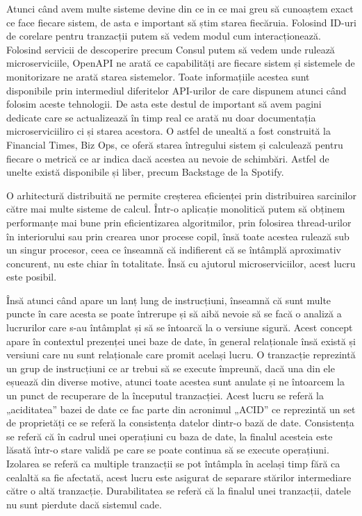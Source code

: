 Atunci când avem multe sisteme devine din ce in ce mai greu să cunoaștem exact ce face fiecare sistem,
de asta e important să știm starea fiecăruia. Folosind ID-uri de corelare pentru tranzacții
putem să vedem modul cum interacționează. Folosind servicii de descoperire precum Consul
putem să vedem unde rulează microserviciile, OpenAPI ne arată ce capabilități are fiecare sistem
și sistemele de monitorizare ne arată starea sistemelor. Toate informațiile acestea sunt
disponibile prin intermediul diferitelor API-urilor de care dispunem atunci când folosim aceste
tehnologii. De asta este destul de important să avem pagini dedicate care se actualizează 
în timp real ce arată nu doar documentația microserviciiliro ci și starea acestora.
O astfel de unealtă a fost construită la Financial Times, Biz Ops, ce oferă starea întregului
sistem și calculează pentru fiecare o metrică ce ar indica dacă acestea au nevoie de 
schimbări. Astfel de unelte există disponibile și liber, precum Backstage de la Spotify.

O arhitectură distribuită ne permite creșterea eficienței prin distribuirea sarcinilor către
mai multe sisteme de calcul. Într-o aplicație monolitică putem să obținem performanțe mai bune
prin eficientizarea algoritmilor, prin folosirea thread-urilor în interiorului sau prin
crearea unor procese copil, însă toate acestea rulează sub un singur procesor, ceea ce înseamnă
că indifierent că se întâmplă aproximativ concurent, nu este chiar în totalitate. Însă
cu ajutorul microserviciilor, acest lucru este posibil.

Însă atunci când apare un lanț lung de instrucțiuni, înseamnă că sunt multe puncte în care
acesta se poate întrerupe și să aibă nevoie să se facă o analiză a lucrurilor care s-au întâmplat
și să se întoarcă la o versiune sigură. Acest concept apare în contextul prezenței unei baze de date,
în general relaționale însă există și versiuni care nu sunt relaționale care promit același lucru.
O tranzacție reprezintă un grup de instrucțiuni ce ar trebui să se execute împreună, dacă
una din ele eșuează din diverse motive, atunci toate acestea sunt anulate și ne întoarcem 
la un punct de recuperare de la începutul tranzacției. Acest lucru se referă la „aciditatea”
bazei de date ce fac parte din acronimul „ACID” ce reprezintă un set de proprietăți 
ce se referă la consistența datelor dintr-o bază de date. Consistența se referă că în cadrul
unei operațiuni cu baza de date, la finalul acesteia este lăsată într-o stare validă pe 
care se poate continua să se execute operațiuni. Izolarea se referă ca multiple tranzacții
se pot întâmpla în același timp fără ca cealaltă sa fie afectată, acest lucru este asigurat
de separare stărilor intermediare către o altă tranzacție. Durabilitatea se referă că la finalul
unei tranzacții, datele nu sunt pierdute dacă sistemul cade.

